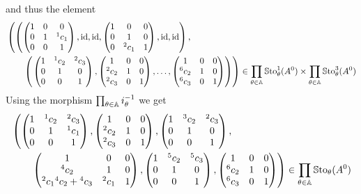 and thus the element
\begin{align*}
  &\left(
  \left(
    \begin{pmatrix} 1 & 0 & 0 \\0 & 1 & {}^1c_1 \\0 & 0 & 1 \end{pmatrix},
    \operatorname{id},\operatorname{id},
    \begin{pmatrix} 1 & 0 & 0 \\0 & 1 & 0 \\0 & {}^2c_1 & 1 \end{pmatrix},
    \operatorname{id},\operatorname{id}
  \right),
  \right.
\\&\qquad\left(
  \left.
    \begin{pmatrix} 1 & {}^1c_2 & {}^2c_3 \\0 & 1 & 0 \\0 & 0 & 1 \end{pmatrix},
    \begin{pmatrix} 1 & 0 & 0 \\{}^2c_2 & 1 & 0 \\{}^2c_3 & 0 & 1 \end{pmatrix},
    \dots,
    \begin{pmatrix} 1 & 0 & 0 \\{}^{6}c_2 & 1 & 0 \\{}^{6}c_3 & 0 & 1 \end{pmatrix}
  \right)
  \right)
  \in
  \prod_{\theta\in\mathbb{A}}\operatorname{\mathbb{S}to}_{\theta}^{1}(A^0)
  \times
  \prod_{\theta\in\mathbb{A}}\operatorname{\mathbb{S}to}_{\theta}^{3}(A^0)
\end{align*}
Using the morphism $\prod_{\theta\in\mathbb{A}}i_\theta^{-1}$ we get
\begin{align*}
  &\left(
    \begin{pmatrix} 1 & {}^1c_2 & {}^2c_3 \\0 & 1 & {}^1c_1 \\0 & 0 & 1 \end{pmatrix},
    \begin{pmatrix} 1 & 0 & 0 \\{}^2c_2 & 1 & 0 \\{}^2c_3 & 0 & 1 \end{pmatrix},
    \begin{pmatrix} 1 & {}^3c_2 & {}^2c_3 \\0 & 1 & 0 \\0 & 0 & 1 \end{pmatrix},
  \right.
\\&\qquad
  \left.
    \begin{pmatrix} 1 & 0 & 0 \\{}^4c_2 & 1 & 0 \\{}^2c_1{}^4c_2+{}^4c_3 & {}^2c_1 & 1 \end{pmatrix},
    \begin{pmatrix} 1 & {}^5c_2 & {}^5c_3 \\0 & 1 & 0 \\0 & 0 & 1 \end{pmatrix},
    \begin{pmatrix} 1 & 0 & 0 \\{}^{6}c_2 & 1 & 0 \\{}^{6}c_3 & 0 & 1 \end{pmatrix}
  \right)
  \in
  \prod_{\theta\in\mathbb{A}}\operatorname{\mathbb{S}to}_{\theta}(A^0)
\end{align*}
